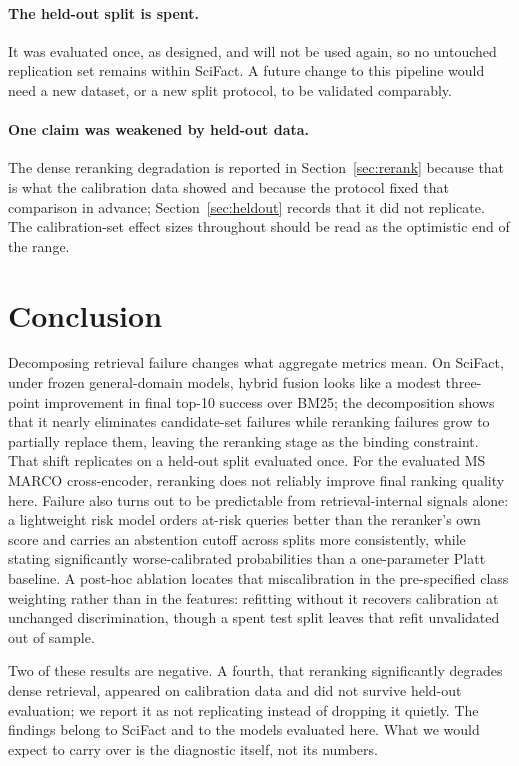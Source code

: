 \documentclass[11pt,a4paper]{article}
\begin{document}
\paragraph{The held-out split is spent.} It was evaluated once, as designed, and will not be
used again, so no untouched replication set remains within SciFact. A future change to this
pipeline would need a new dataset, or a new split protocol, to be validated comparably.

\paragraph{One claim was weakened by held-out data.} The dense reranking degradation is reported
in Section~\ref{sec:rerank} because that is what the calibration data showed and because the
protocol fixed that comparison in advance; Section~\ref{sec:heldout} records that it did not
replicate. The calibration-set effect sizes throughout should be read as the optimistic end of
the range.

\section{Conclusion}

Decomposing retrieval failure changes what aggregate metrics mean. On SciFact, under frozen
general-domain models, hybrid fusion looks like a modest three-point improvement in final top-10
success over BM25; the decomposition shows that it nearly eliminates candidate-set failures while
reranking failures grow to partially replace them, leaving the reranking stage as the binding
constraint. That shift replicates on a held-out split evaluated once. For the evaluated
MS MARCO cross-encoder, reranking does not reliably improve final ranking quality here. Failure
also turns out to be predictable from retrieval-internal signals alone: a lightweight risk model
orders at-risk queries better than the reranker's own score and carries an abstention cutoff
across splits more consistently, while stating significantly worse-calibrated probabilities than
a one-parameter Platt baseline. A post-hoc ablation locates that miscalibration in the
pre-specified class weighting rather than in the features: refitting without it recovers
calibration at unchanged discrimination, though a spent test split leaves that refit unvalidated
out of sample.

Two of these results are negative. A fourth, that reranking significantly degrades dense
retrieval, appeared on calibration data and did not survive held-out evaluation; we report it as
not replicating instead of dropping it quietly. The findings belong to SciFact and to the models
evaluated here. What we would expect to carry over is the diagnostic itself, not its numbers.
\end{document}
